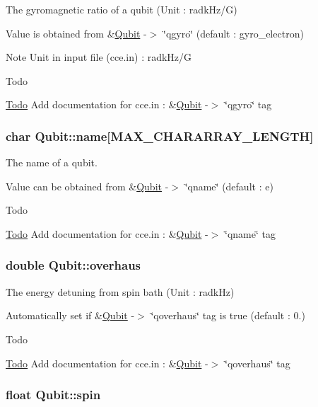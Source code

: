The gyromagnetic ratio of a qubit (Unit \-: radk\-Hz/\-G) 

Value is obtained from \&\hyperlink{structQubit}{Qubit} -\/$>$ \char`\"{}qgyro\char`\"{} (default \-: gyro\-\_\-electron) \begin{DoxyNote}{Note}
Unit in input file (cce.\-in) \-: radk\-Hz/\-G 
\end{DoxyNote}
\begin{DoxyRefDesc}{Todo}
\item[\hyperlink{todo__todo000019}{Todo}]Add documentation for cce.\-in \-: \&\hyperlink{structQubit}{Qubit} -\/$>$ \char`\"{}qgyro\char`\"{} tag \end{DoxyRefDesc}
\hypertarget{structQubit_ab65a0dfa0efbd8a7862403f4704c1587}{
\subsubsection[{name}]{\setlength{\rightskip}{0pt plus 5cm}char Qubit\-::name\mbox{[}M\-A\-X\-\_\-\-C\-H\-A\-R\-A\-R\-R\-A\-Y\-\_\-\-L\-E\-N\-G\-T\-H\mbox{]}}}\label{structQubit_ab65a0dfa0efbd8a7862403f4704c1587}


The name of a qubit. 

Value can be obtained from \&\hyperlink{structQubit}{Qubit} -\/$>$ \char`\"{}qname\char`\"{} (default \-: e) \begin{DoxyRefDesc}{Todo}
\item[\hyperlink{todo__todo000017}{Todo}]Add documentation for cce.\-in \-: \&\hyperlink{structQubit}{Qubit} -\/$>$ \char`\"{}qname\char`\"{} tag \end{DoxyRefDesc}
\hypertarget{structQubit_aecb3943042094c4be043f375626dbd24}{
\subsubsection[{overhaus}]{\setlength{\rightskip}{0pt plus 5cm}double Qubit\-::overhaus}}\label{structQubit_aecb3943042094c4be043f375626dbd24}


The energy detuning from spin bath (Unit \-: radk\-Hz) 

Automatically set if \&\hyperlink{structQubit}{Qubit} -\/$>$ \char`\"{}qoverhaus\char`\"{} tag is true (default \-: 0.) \begin{DoxyRefDesc}{Todo}
\item[\hyperlink{todo__todo000022}{Todo}]Add documentation for cce.\-in \-: \&\hyperlink{structQubit}{Qubit} -\/$>$ \char`\"{}qoverhaus\char`\"{} tag \end{DoxyRefDesc}
\hypertarget{structQubit_a858930b7d9d9cafc70f26ab7993dadad}{
\subsubsection[{spin}]{\setlength{\rightskip}{0pt plus 5cm}float Qubit\-::spin}}\label{structQubit_a858930b7d9d9cafc70f26ab7993dadad}


